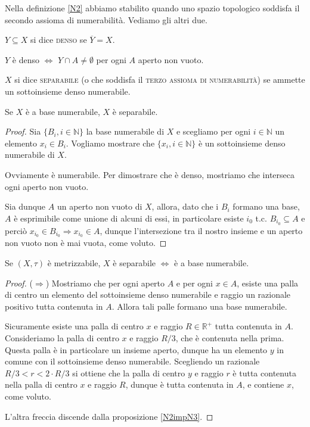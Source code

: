 Nella definizione \ref{N2} abbiamo stabilito quando uno spazio topologico
soddisfa il secondo assioma di numerabilità. Vediamo gli altri due.

\begin{defn}
	$Y \subseteq X$ si dice \textsc{denso} se $\overline{Y}=X$.
\end{defn}

\begin{oss}
	$Y$ è denso $\Leftrightarrow$ $Y \cap A \not=\emptyset$ per ogni $A$ aperto
	non vuoto.
\end{oss}

\begin{defn} \label{N3}
	$X$ si dice \textsc{separabile} (o che soddisfa il \textsc{terzo assioma di
	numerabilità}) se ammette un sottoinsieme denso numerabile.
\end{defn}

\begin{prop} \label{N2impN3}
	Se $X$ è a base numerabile, $X$ è separabile.
\end{prop}

\begin{proof}
	Sia $\{ B_i, {i \in \mathbb{N}}\}$ la base numerabile di $X$ e scegliamo per
	ogni $i \in \mathbb{N}$ un elemento $x_i \in B_i$. Vogliamo mostrare che $\{
	x_i, i \in \mathbb{N} \}$ è un sottoinsieme denso numerabile di $X$.

	Ovviamente è numerabile. Per dimostrare che è denso, mostriamo che interseca
	ogni aperto non vuoto.

	Sia dunque $A$ un aperto non vuoto di $X$, allora, dato che i $B_i$ formano
	una base, $A$ è esprimibile come unione di alcuni di essi, in particolare
	esiste $i_0$ t.c. $B_{i_0} \subseteq A$ e perciò $x_{i_0} \in B_{i_0}
	\Rightarrow x_{i_0} \in A$, dunque l'intersezione tra il nostro insieme e un
	aperto non vuoto non è mai vuota, come voluto.
\end{proof}

\begin{prop} \label{metr-num}
	Se $(X, \tau)$ è metrizzabile, $X$ è separabile $\Leftrightarrow$ è a base
	numerabile.
\end{prop}

\begin{proof}
	($\Rightarrow$) Mostriamo che per ogni aperto $A$ e per ogni $x \in A$,
	esiste una palla di centro un elemento del sottoinsieme denso numerabile e
	raggio un razionale positivo tutta contenuta in $A$. Allora tali palle
	formano una base numerabile.

	Sicuramente esiste una palla di centro $x$ e raggio $R \in \mathbb{R}^+$
	tutta contenuta in $A$. Consideriamo la palla di centro $x$ e raggio $R/3$,
	che è contenuta nella prima. Questa palla è in particolare un insieme
	aperto, dunque ha un elemento $y$ in comune con il sottoinsieme denso
	numerabile. Scegliendo un razionale $R/3<r<2 \cdot R/3$ si ottiene che la
	palla di centro $y$ e raggio $r$ è tutta contenuta nella palla di centro $x$
	e raggio $R$, dunque è tutta contenuta in $A$, e contiene $x$, come voluto.

	L'altra freccia discende dalla proposizione \ref{N2impN3}.
\end{proof}

